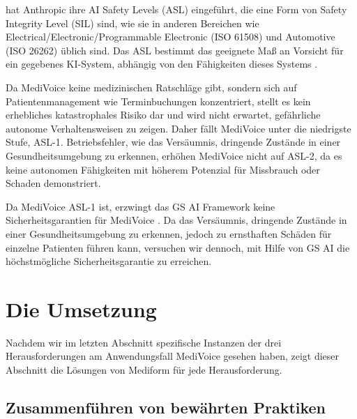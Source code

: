\documentclass[twocolumn]{article}
\begin{document}
hat Anthropic ihre AI Safety Levels (ASL) eingeführt, die eine Form von Safety Integrity Level (SIL) sind, wie sie in anderen Bereichen wie Electrical/Electronic/Programmable Electronic (ISO 61508) und Automotive (ISO 26262) üblich sind. Das ASL bestimmt das geeignete Maß an Vorsicht für ein gegebenes KI-System, abhängig von den Fähigkeiten dieses Systems \cite{Anthropic23, Anthropic23b}.

Da MediVoice keine medizinischen Ratschläge gibt, sondern sich auf Patientenmanagement wie Terminbuchungen konzentriert, stellt es kein erhebliches katastrophales Risiko dar und wird nicht erwartet, gefährliche autonome Verhaltensweisen zu zeigen. Daher fällt MediVoice unter die niedrigste Stufe, ASL-1. Betriebsfehler, wie das Versäumnis, dringende Zustände in einer Gesundheitsumgebung zu erkennen, erhöhen MediVoice nicht auf ASL-2, da es keine autonomen Fähigkeiten mit höherem Potenzial für Missbrauch oder Schaden demonstriert.

Da MediVoice ASL-1 ist, erzwingt das GS AI Framework keine Sicherheitsgarantien für MediVoice \cite{Dalrymple24}. Da das Versäumnis, dringende Zustände in einer Gesundheitsumgebung zu erkennen, jedoch zu ernsthaften Schäden für einzelne Patienten führen kann, versuchen wir dennoch, mit Hilfe von GS AI die höchstmögliche Sicherheitsgarantie zu erreichen.

\section{Die Umsetzung}

Nachdem wir im letzten Abschnitt spezifische Instanzen der drei Herausforderungen am Anwendungsfall MediVoice gesehen haben, zeigt dieser Abschnitt die Lösungen von Mediform für jede Herausforderung.

\subsection{Zusammenführen von bewährten Praktiken}
\end{document}
